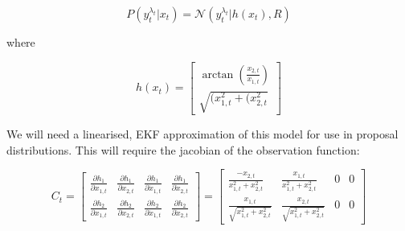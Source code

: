 \begin{equation}
P(y_t^{\lambda_t}|x_t) = \mathcal{N}(y_t^{\lambda_t}|h(x_t), R)
\label{eq:}
\end{equation}

where

\begin{equation}
h(x_t) = \begin{bmatrix}
\arctan \left( \frac{x_{2,t}}{x_{1,t}} \right)\\
\sqrt{ (x_{1,t}^2 + (x_{2,t}^2 }
\end{bmatrix}
\label{eq:}
\end{equation}

We will need a linearised, EKF approximation of this model for use in proposal distributions. This will require the jacobian of the observation function:

\begin{equation}
C_t = \begin{bmatrix} \frac{\partial h_1}{\partial x_{1,t}} & \frac{\partial h_1}{\partial x_{2,t}} & \frac{\partial h_1}{\partial \dot{x}_{1,t}} & \frac{\partial h_1}{\partial \dot{x}_{2,t}} \\ \frac{\partial h_2}{\partial x_{1,t}} & \frac{\partial h_2}{\partial x_{2,t}} & \frac{\partial h_2}{\partial \dot{x}_{1,t}} & \frac{\partial h_2}{\partial \dot{x}_{2,t}} \end{bmatrix}
= \begin{bmatrix} \frac{-x_{2,t}}{x_{1,t}^2 + x_{2,t}^2} & \frac{x_{1,t}}{x_{1,t}^2 + x_{2,t}^2} & 0 & 0 \\ \frac{x_{1,t}}{\sqrt{x_{1,t}^2 + x_{2,t}^2}} & \frac{x_{2,t}}{\sqrt{x_{1,t}^2 + x_{2,t}^2}} & 0 & 0 \end{bmatrix}
\label{eq:}
\end{equation}